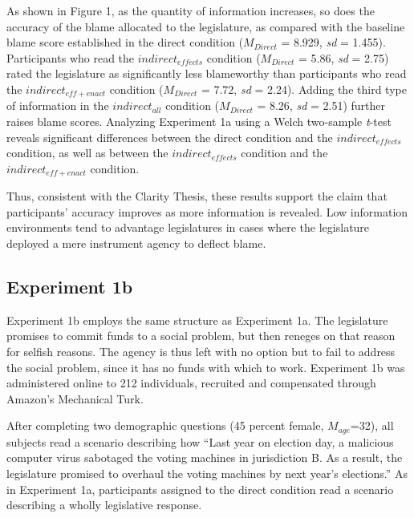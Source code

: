 \documentclass{article}
\begin{document}
As shown in Figure 1, as the quantity of information increases, so does the accuracy of the blame allocated to the legislature, as compared with the baseline blame score established in the direct condition (${M}_{Direct}$ = 8.929, \emph{sd} = 1.455). Participants who read the $indirect_{effects}$ condition (${M}_{Direct}$ = 5.86, \emph{sd} = 2.75) rated the legislature as significantly less blameworthy than participants who read the $indirect_{eff+enact}$ condition (${M}_{Direct}$ = 7.72, \emph{sd} = 2.24). Adding the third type of information in the $indirect_{all}$ condition (${M}_{Direct}$ = 8.26, \emph{sd} = 2.51) further raises blame scores. Analyzing Experiment 1a using a Welch two-sample \emph{t}-test reveals significant differences between the direct condition and the $indirect_{effects}$ condition, as well as between the $indirect_{effects}$ condition and the $indirect_{eff+enact}$ condition. 

Thus, consistent with the Clarity Thesis, these results support the claim that participants' accuracy improves as more information is revealed. Low information environments tend to advantage legislatures in cases where the legislature deployed a mere instrument agency to deflect blame. 




\subsection{Experiment 1b} 

Experiment 1b employs the same structure as Experiment 1a. The legislature promises to commit funds to a social problem, but then reneges on that reason for selfish reasons. The agency is thus left with no option but to fail to address the social problem, since it has no funds with which to work. Experiment 1b was administered online to 212 individuals, recruited and compensated through Amazon's Mechanical Turk. 

After completing two demographic questions (45 percent female, ${M}_{age}$=32), all subjects read a scenario describing how ``Last year on election day, a malicious computer virus sabotaged the voting machines in jurisdiction B.  As a result, the legislature promised to overhaul the voting machines by next year's elections.'' As in Experiment 1a, participants assigned to the direct condition read a scenario describing a wholly legislative response.
\end{document}
